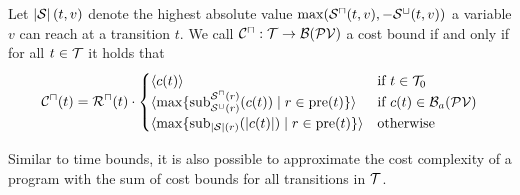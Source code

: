 \begin{definition}
  Let $\abs{\mathcal{S}}(t, v)$ denote the highest absolute value $\max(\USize(t, v), -\LSize(t, v))$ a variable $v$ can reach at a transition $t$.
  We call $\UCost: \TSet \rightarrow \BoundSet(\PVSet)$ a cost bound if and only if for all $t \in \TSet$ it holds that
  \[ \UCost(t) = \UTime(t) \cdot
  \begin{cases}
    \maxO{\cost(t)} & \text{if } t \in \TSet_0 \\
    \maxO{\maximum{\apprsubst{\cost(t)}{\LSize(\pret)}{\USize(\pret)} \mid \pret \in \pre(t)}} & \text{if } \cost(t) \in \BoundSet_a(\PVSet) \\
    \maxO{\maximum{\exactsubst{\abs{\cost(t)}}{\abs{\mathcal{S}}(\pret)}{} \mid \pret \in \pre(t)}} & \text{otherwise} \\
  \end{cases}
  \]
\end{definition}

Similar to time bounds, it is also possible to approximate the cost complexity of a program with the sum of cost bounds for all transitions in $\TSet$.


